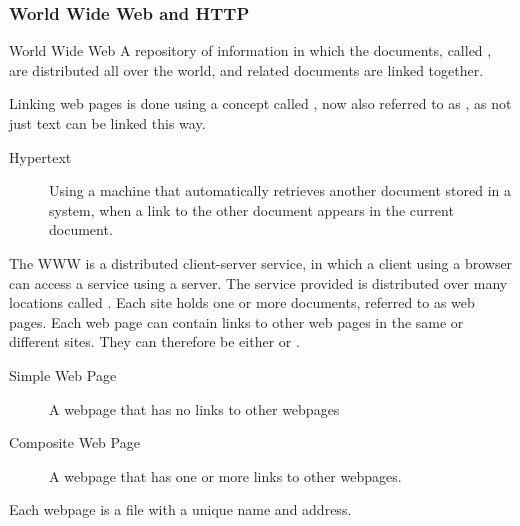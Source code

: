 \documentclass[\main/notes.tex]{subfiles}
\begin{document}
				\subsubsection{World Wide Web and HTTP}
					\begin{definition}{World Wide Web}
						A repository of information in which the documents, called , are distributed all over the world, and related documents are linked together.

						Linking web pages is done using a concept called , now also referred to as , as not just text can be linked this way.

						\begin{indentparagraph}
							\begin{description}
								\item[Hypertext] Using a machine that automatically retrieves another document stored in a system, when a link to the other document appears in the current document.
							\end{description}
						\end{indentparagraph}

						The WWW is a distributed client-server service, in which a client using a browser can access a service using a server. The service provided is distributed over many locations called . Each site holds one or more documents, referred to as web pages. Each web page can contain links to other web pages in the same or different sites. They can therefore be either  or .
						\begin{indentparagraph}
							\begin{description}
								\item[Simple Web Page] A webpage that has no links to other webpages
								\item[Composite Web Page] A webpage that has one or more links to other webpages.
							\end{description}
						\end{indentparagraph}

						Each webpage is a file with a unique name and address.
					\end{definition}
\end{document}
